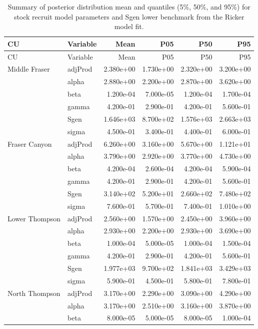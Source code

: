 \documentclass[11pt]{book}
\begin{document}
\begin{longtable}[]{@{}llrrrr@{}}
\caption{\label{tab:coho-postSummary-Ricker}Summary of posterior distribution mean and quantiles (5\%, 50\%, and 95\%) for stock recruit model parameters and Sgen lower benchmark from the Ricker model fit.}\tabularnewline
\toprule
CU & Variable & Mean & P05 & P50 & P95 \\
\midrule
\endfirsthead
\toprule
CU & Variable & Mean & P05 & P50 & P95 \\
\midrule
\endhead
Middle Fraser & adjProd & 2.380e+00 & 1.730e+00 & 2.320e+00 & 3.200e+00 \\
& alpha & 2.880e+00 & 2.200e+00 & 2.870e+00 & 3.620e+00 \\
& beta & 1.200e-04 & 7.000e-05 & 1.200e-04 & 1.700e-04 \\
& gamma & 4.200e-01 & 2.900e-01 & 4.200e-01 & 5.600e-01 \\
& Sgen & 1.646e+03 & 8.700e+02 & 1.576e+03 & 2.663e+03 \\
& sigma & 4.500e-01 & 3.400e-01 & 4.400e-01 & 6.000e-01 \\
Fraser Canyon & adjProd & 6.260e+00 & 3.160e+00 & 5.670e+00 & 1.121e+01 \\
& alpha & 3.790e+00 & 2.920e+00 & 3.770e+00 & 4.730e+00 \\
& beta & 4.200e-04 & 2.600e-04 & 4.200e-04 & 5.900e-04 \\
& gamma & 4.200e-01 & 2.900e-01 & 4.200e-01 & 5.600e-01 \\
& Sgen & 3.140e+02 & 5.200e+01 & 2.660e+02 & 7.480e+02 \\
& sigma & 7.600e-01 & 5.700e-01 & 7.400e-01 & 1.010e+00 \\
Lower Thompson & adjProd & 2.560e+00 & 1.570e+00 & 2.450e+00 & 3.960e+00 \\
& alpha & 2.930e+00 & 2.200e+00 & 2.930e+00 & 3.690e+00 \\
& beta & 1.000e-04 & 5.000e-05 & 1.000e-04 & 1.500e-04 \\
& gamma & 4.200e-01 & 2.900e-01 & 4.200e-01 & 5.600e-01 \\
& Sgen & 1.977e+03 & 9.700e+02 & 1.841e+03 & 3.429e+03 \\
& sigma & 5.900e-01 & 4.500e-01 & 5.800e-01 & 7.800e-01 \\
North Thompson & adjProd & 3.170e+00 & 2.290e+00 & 3.090e+00 & 4.290e+00 \\
& alpha & 3.170e+00 & 2.510e+00 & 3.160e+00 & 3.870e+00 \\
& beta & 8.000e-05 & 5.000e-05 & 8.000e-05 & 1.000e-04 \\

\end{longtable}
\end{document}
